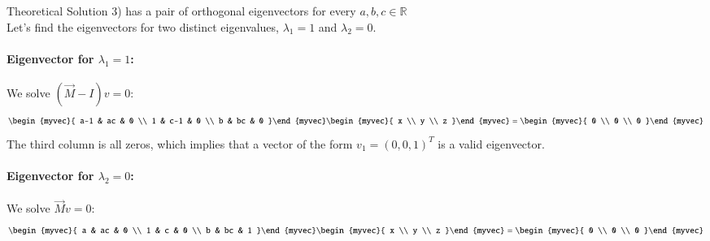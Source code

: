 \documentclass{beamer}
\begin{document}
\begin{frame}{Theoretical Solution}
3)  has a pair of orthogonal eigenvectors for every $a,b,c \in \mathbb{R}$\\
Let's find the eigenvectors for two distinct eigenvalues, $\lambda_1=1$ and $\lambda_2=0$.
\paragraph{Eigenvector for $\lambda_1 = 1$:} We solve $(\vec{M}-I)v = 0$:
\begin{align} \begin{myvec}{ a-1 & ac & 0 \\ 1 & c-1 & 0 \\ b & bc & 0 }\end{myvec} \begin{myvec}{ x \\ y \\ z }\end{myvec} = \begin{myvec}{ 0 \\ 0 \\ 0 }\end{myvec} 
\end{align}
The third column is all zeros, which implies that a vector of the form $v_1 = (0, 0, 1)^T$ is a valid eigenvector.

\paragraph{Eigenvector for $\lambda_2 = 0$:} We solve $\vec{M}v=0$:
\begin{align} 
\begin{myvec}{ a & ac & 0 \\ 1 & c & 0 \\ b & bc & 1 }\end{myvec} \begin{myvec}{ x \\ y \\ z }\end{myvec} = \begin{myvec}{ 0 \\ 0 \\ 0 }\end{myvec} 
\end{align}
\end{frame}
\end{document}
